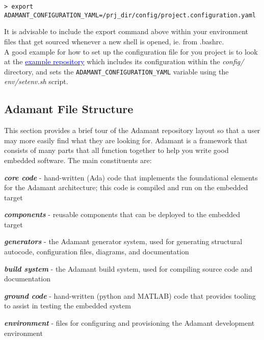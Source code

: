 \vspace{5mm} %
\begin{verbatim}
> export ADAMANT_CONFIGURATION_YAML=/prj_dir/config/project.configuration.yaml
\end{verbatim}
\vspace{5mm} %

It is advisable to include the export command above within your environment files that get sourced whenever a new shell is opened, ie. from .bashrc. \\

A good example for how to set up the configuration file for you project is to look at the \href{https://github.com/lasp/adamant_example/tree/main}{\textcolor{blue}{example repository}} which includes its configuration within the \textit{config/} directory, and sets the \texttt{ADAMANT\_CONFIGURATION\_YAML} variable using the \textit{env/setenv.sh} script.

\subsection{Adamant File Structure}

This section provides a brief tour of the Adamant repository layout so that a user may more easily find what they are looking for. Adamant is a framework that consists of many parts that all function together to help you write good embedded software. The main constituents are:

\vspace{5mm} %
\begin{spaceditemize}
  \item \textbf{\textit{core code}} - hand-written (Ada) code that implements the foundational elements for the Adamant architecture; this code is compiled and run on the embedded target
  \item \textbf{\textit{components}} - reusable components that can be deployed to the embedded target
  \item \textbf{\textit{generators}} - the Adamant generator system, used for generating structural autocode, configuration files, diagrams, and documentation 
  \item \textbf{\textit{build system}} - the Adamant build system, used for compiling source code and documentation
  \item \textbf{\textit{ground code}} - hand-written (python and MATLAB) code that provides tooling to assist in testing the embedded system
  \item \textbf{\textit{environment}} - files for configuring and provisioning the Adamant development environment
\end{spaceditemize}
\vspace{5mm} %

